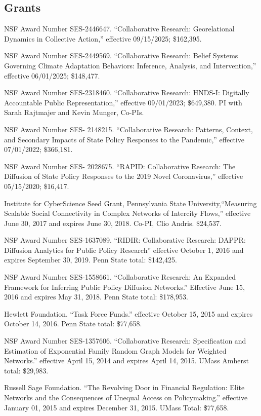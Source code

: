 \documentclass[overlapped,line]{res}
\begin{document}
\begin{resume}
\section{\bf Grants}
\begin{etaremune}
\item NSF Award Number SES-2446647. ``Collaborative Research: Georelational Dynamics in Collective Action,'' effective 09/15/2025; \$162,395.
\item NSF Award Number SES-2449569. ``Collaborative Research: Belief Systems Governing Climate Adaptation Behaviors: Inference, Analysis, and Intervention,'' effective 06/01/2025; \$148,477.
\item NSF Award Number SES-2318460. ``Collaborative Research: HNDS-I: Digitally Accountable Public Representation,'' effective 09/01/2023; \$649,380.  PI with Sarah Rajtmajer and Kevin Munger, Co-PIs.
\item NSF Award Number SES- 2148215. ``Collaborative Research: Patterns, Context, and Secondary Impacts of State Policy Responses to the Pandemic,'' effective 07/01/2022; \$366,181.
\item NSF Award Number SES- 2028675. ``RAPID: Collaborative Research: The Diffusion of State Policy Responses to the 2019 Novel Coronavirus,'' effective 05/15/2020; \$16,417.
\item Institute for CyberScience Seed Grant, Pennsylvania State University,``Measuring Scalable Social Connectivity in Complex Networks of Intercity Flows,'' effective June 30, 2017 and expires June 30, 2018. Co-PI, Clio Andris. \$24,537. 
 \item NSF Award Number SES-1637089. ``RIDIR: Collaborative Research: DAPPR: Diffusion Analytics for Public Policy Research'' effective October 1, 2016 and expires September 30, 2019.  Penn State total: \$142,425.
 \item NSF Award Number SES-1558661. ``Collaborative Research: An Expanded Framework for Inferring Public Policy Diffusion Networks.'' Effective June 15, 2016 and expires May 31, 2018. Penn State total: \$178,953.
  \item Hewlett Foundation. ``Task Force Funds.'' effective October 15, 2015 and expires October 14, 2016. Penn State total: \$77,658.
 \item NSF Award Number SES-1357606. ``Collaborative Research: Specification and Estimation of Exponential Family Random Graph Models for Weighted Networks.'' effective April 15, 2014 and expires April 14, 2015.  UMass Amherst total: \$29,983.
 \item Russell Sage Foundation. ``The Revolving Door in Financial Regulation: Elite Networks and the Consequences of Unequal Access on Policymaking.'' effective January 01, 2015 and expires December 31, 2015. UMass Total: \$77,658.

\end{etaremune}
\end{resume}
\end{document}
